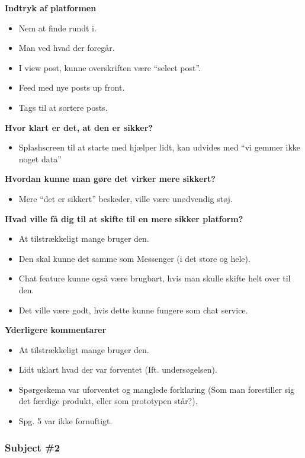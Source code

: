 \noindent\textbf{Indtryk af platformen}
\begin{itemize}
    \item Nem at finde rundt i.
    \item Man ved hvad der foregår.
    \item I view post, kunne overskriften være “select post”.
    \item Feed med nye posts up front.
    \item Tags til at sortere posts.
\end{itemize}

\noindent\textbf{Hvor klart er det, at den er sikker?}
\begin{itemize}
    \item Splashscreen til at starte med hjælper lidt, kan udvides med “vi gemmer ikke noget data”
\end{itemize}

\noindent\textbf{Hvordan kunne man gøre det virker mere sikkert?}
\begin{itemize}
    \item Mere “det er sikkert” beskeder, ville være unødvendig støj.
\end{itemize}

\noindent\textbf{Hvad ville få dig til at skifte til en mere sikker platform?}
\begin{itemize}
    \item At tilstrækkeligt mange bruger den.
    \item Den skal kunne det samme som Messenger (i det store og hele).
    \item Chat feature kunne også være brugbart, hvis man skulle skifte helt over til den.
    \item Det ville være godt, hvis dette kunne fungere som chat service.
\end{itemize}

\noindent\textbf{Yderligere kommentarer}
\begin{itemize}
    \item At tilstrækkeligt mange bruger den.
    \item Lidt uklart hvad der var forventet (Ift. undersøgelsen).
    \item Spørgeskema var uforventet og manglede forklaring (Som man forestiller sig det færdige produkt, eller som prototypen står?).
    \item Spg. 5 var ikke fornuftigt.
\end{itemize}

\subsubsection{Subject \#2}

